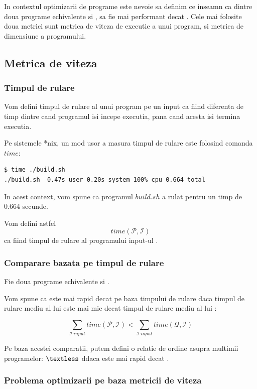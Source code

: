 In contextul optimizarii de programe este nevoie sa definim ce
inseamn ca dintre doua programe echivalente  si , 
sa fie mai performant decat .
Cele mai folosite doua metrici sunt metrica de viteza de
executie a unui program, si metrica de dimensiune a programului.

\subsection{Metrica de viteza}

\subsubsection{Timpul de rulare}

Vom defini timpul de rulare al unui program  pe un input
 ca fiind diferenta de timp dintre cand programul isi incepe
executia, pana cand acesta isi termina executia.

Pe sistemele *nix, un mod usor a masura timpul de rulare este
folosind comanda $time$:

\begin{lstlisting}[language=Bash]
$ time ./build.sh
./build.sh  0.47s user 0.20s system 100% cpu 0.664 total
\end{lstlisting}

In acest context, vom spune ca programul $build.sh$ a rulat
pentru un timp de 0.664 secunde.

Vom defini astfel \[time(\mathcal{P}, \mathcal{I})\] ca fiind
timpul de rulare al programului  input-ul .

\subsubsection{Comparare bazata pe timpul de rulare}

Fie doua programe echivalente  si .

Vom spune ca  este mai rapid decat  pe baza timpului de
rulare daca timpul de rulare mediu al lui  este mai mic
decat timpul de rulare mediu al lui :

\[
	\sum_{\mathcal{I} \ input} time(\mathcal{P}, \mathcal{I}) <
	\sum_{\mathcal{I} \ input} time(\mathcal{Q}, \mathcal{I})
\]

Pe baza acestei comparatii, putem defini o relatie de ordine
asupra multimii programelor:  $\textless$  ddaca 
este mai rapid decat .

\subsubsection{Problema optimizarii pe baza metricii de viteza}

